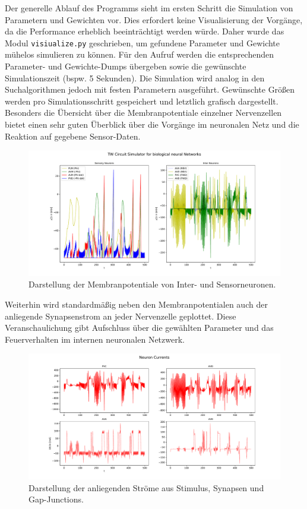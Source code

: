	Der generelle Ablauf des Programms sieht im ersten Schritt die Simulation von Parametern und Gewichten vor. Dies erfordert keine Visualisierung der Vorgänge, da die Performance erheblich beeinträchtigt werden würde. Daher wurde das Modul \texttt{visiualize.py} geschrieben, um gefundene Parameter und Gewichte mühelos simulieren zu können. Für den Aufruf werden die entsprechenden Parameter- und Gewichte-Dumps übergeben sowie die gewünschte Simulationszeit (bspw. 5 Sekunden). Die Simulation wird analog in den Suchalgorithmen jedoch mit festen Parametern ausgeführt. Gewünschte Größen werden pro Simulationsschritt gespeichert und letztlich grafisch dargestellt. Besonders die Übersicht über die Membranpotentiale einzelner Nervenzellen bietet einen sehr guten Überblick über die Vorgänge im neuronalen Netz und die Reaktion auf gegebene Sensor-Daten.
	\begin{figure}[H] %
		\centering
		\includegraphics[width=16cm]{figures/chap_implement/plot_membranpot.pdf}
		\caption{Darstellung der Membranpotentiale von Inter- und Sensorneuronen.}
		\label{fig:plot_membr}
	\end{figure}
	Weiterhin wird standardmäßig neben den Membranpotentialen auch der anliegende Synapsenstrom an jeder Nervenzelle geplottet. Diese Veranschaulichung gibt Aufschluss über die gewählten Parameter und das Feuerverhalten im internen neuronalen Netzwerk.
	\begin{figure}[H] %
		\centering
		\includegraphics[width=16cm]{figures/chap_implement/plot_synstrom.pdf}
		\caption{Darstellung der anliegenden Ströme aus Stimulus, Synapsen und Gap-Junctions.}
		\label{fig:plot_synstrom}
	\end{figure}

